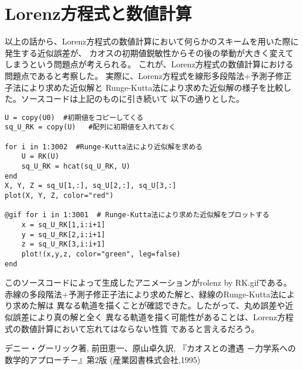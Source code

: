 \documentclass[12pt]{ltjsarticle}
\begin{document}
\section{Lorenz方程式と数値計算}
以上の話から、Lorenz方程式の数値計算において何らかのスキームを用いた際に発生する近似誤差が、
カオスの初期値鋭敏性からその後の挙動が大きく変えてしまうという問題点が考えられる。
これが、Lorenz方程式の数値計算における問題点であると考察した。
実際に、Lorenz方程式を線形多段階法+予測子修正子法により求めた近似解と
Runge-Kutta法により求めた近似解の様子を比較した。ソースコードは上記のものに引き続いて
以下の通りとした。
\begin{lstlisting}
U = copy(U0)  #初期値をコピーしてくる
sq_U_RK = copy(U)   #配列に初期値を入れておく

for i in 1:3002  #Runge-Kutta法により近似解を求める
    U = RK(U)
    sq_U_RK = hcat(sq_U_RK, U)
end
X, Y, Z = sq_U[1,:], sq_U[2,:], sq_U[3,:]
plot(X, Y, Z, color="red")

@gif for i in 1:3001  # Runge-Kutta法により求めた近似解をプロットする
    x = sq_U_RK[1,i:i+1]
    y = sq_U_RK[2,i:i+1]
    z = sq_U_RK[3,i:i+1]
    plot!(x,y,z, color="green", leg=false)
end
\end{lstlisting}
このソースコードによって生成したアニメーションがrolenz by RK.gifである。
赤線の多段階法+予測子修正子法により求めた解と、緑線のRunge-Kutta法により求めた解は
異なる軌道を描くことが確認できた。したがって、丸め誤差や近似誤差により真の解と全く
異なる軌道を描く可能性があることは、Lorenz方程式の数値計算において忘れてはならない性質
であると言えるだろう。

\begin{thebibliography}{1}
     デニー・グーリック著, 前田恵一、原山卓久訳,
    『カオスとの遭遇 －力学系への数学的アプローチ－』第2版 (産業図書株式会社,1995)
\end{thebibliography}
\end{document}
